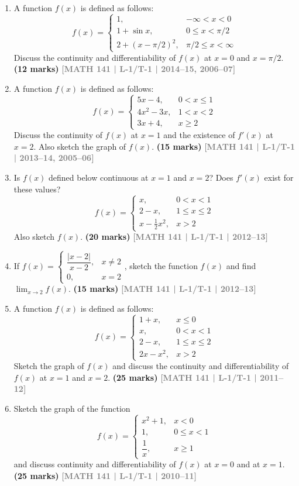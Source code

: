 \documentclass[12pt,a3paper]{article}
\newcommand{\yr}[1]{\hfill\textcolor{gray}{\small\textbf{[#1]}}}
\newcommand{\mk}[1]{\textcolor{orange!70!black}{\small\textbf{(#1 marks)}}}
\begin{document}
\begin{enumerate}
\item A function $f(x)$ is defined as follows:
\[
f(x)=\begin{cases}1, & -\infty<x<0\\ 1+\sin x, & 0\le x<\pi/2\\ 2+(x-\pi/2)^{2}, & \pi/2\le x<\infty\end{cases}
\]
Discuss the continuity and differentiability of $f(x)$ at $x=0$ and $x=\pi/2$.
\mk{12} \yr{MATH 141 | L-1/T-1 | 2014--15, 2006--07}

\item A function $f(x)$ is defined as follows:
\[
f(x)=\begin{cases}5x-4, & 0<x\le 1\\ 4x^{2}-3x, & 1<x<2\\ 3x+4, & x\ge 2\end{cases}
\]
Discuss the continuity of $f(x)$ at $x=1$ and the existence of $f'(x)$ at $x=2$. Also sketch the graph of $f(x)$.
\mk{15} \yr{MATH 141 | L-1/T-1 | 2013--14, 2005--06}

\item Is $f(x)$ defined below continuous at $x=1$ and $x=2$? Does $f'(x)$ exist for these values?
\[
f(x)=\begin{cases}x, & 0<x<1\\ 2-x, & 1\le x\le 2\\ x-\tfrac{1}{2}x^{2}, & x>2\end{cases}
\]
Also sketch $f(x)$.
\mk{20} \yr{MATH 141 | L-1/T-1 | 2012--13}

\item If $f(x)=\begin{cases}\dfrac{|x-2|}{x-2}, & x\neq 2\\[4pt] 0, & x=2\end{cases}$, sketch the function $f(x)$ and find $\displaystyle\lim_{x\to 2}f(x)$.
\mk{15} \yr{MATH 141 | L-1/T-1 | 2012--13}

\item A function $f(x)$ is defined as follows:
\[
f(x)=\begin{cases}1+x, & x\le 0\\ x, & 0<x<1\\ 2-x, & 1\le x\le 2\\ 2x-x^{2}, & x>2\end{cases}
\]
Sketch the graph of $f(x)$ and discuss the continuity and differentiability of $f(x)$ at $x=1$ and $x=2$.
\mk{25} \yr{MATH 141 | L-1/T-1 | 2011--12}

\item Sketch the graph of the function
\[
f(x)=\begin{cases}x^{2}+1, & x<0\\ 1, & 0\le x<1\\ \dfrac{1}{x}, & x\ge 1\end{cases}
\]
and discuss continuity and differentiability of $f(x)$ at $x=0$ and at $x=1$.
\mk{25} \yr{MATH 141 | L-1/T-1 | 2010--11}


\end{enumerate}
\end{document}
